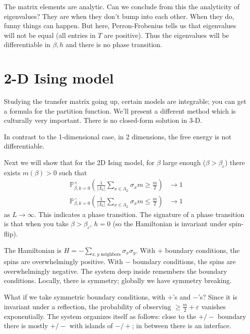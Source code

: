 \documentclass[12pt]{book}
\theoremstyle{norm}
\begin{document}
The matrix elements are analytic. Can we conclude from this the analyticity of eigenvalues? They are when they don't bump into each other. When they do, funny things can happen. But here, Perron-Frobenius tells us that eigenvalues will not be equal (all entries in $T$ are positive). Thus the eigenvalues will be differentiable in $\beta,h$ and there is no phase transition.

\section{2-D Ising model}

Studying the transfer matrix going up, certain models are integrable; you can get a formula for the partition function. We'll present a different method which is culturally very important.
There is no closed-form solution in 3-D.

In contrast to the 1-dimensional case, in 2 dimensions, the free energy is not differentiable. 

Next we will show that for the 2D Ising model, for $\beta$ large enough ($\beta>\beta_c$) there exists $m(\beta)>0$ such that 
\begin{align}
\mathbb{P}_{\beta,k=0}^+\left( {\frac{1}{|\Lambda_L|}\sum_{x\in \Lambda_L} \sigma_x m\ge\frac{m}{2}} \right)&\to 1\\
\mathbb{P}_{\beta,k=0}^-\left( {\frac{1}{|\Lambda_L|}\sum_{x\in \Lambda_L} \sigma_x m\le \frac{m}{2}} \right)&\to 1
\end{align}
as $L\to \infty$. This indicates a phase transition. 
The signature of a phase transition is that when you take $\beta>\beta_c$, $h=0$ (so the Hamiltonian is invariant under spin-flip).

The Hamiltonian is $H=-\sum_{x,y\text{ neighbors}} \sigma_x\sigma_y$.
With $+$ boundary conditions, the spins are overwhelmingly positive. With $-$ boundary conditions, the spins are overwhelmingly negative. The system deep inside remembers the boundary conditions. 
Locally, there is symmetry; globally we have symmetry breaking.

What if we take symmetric boundary conditions, with $+$'s and $-$'s? Since it is invariant under a reflection, the probability of observing $\ge \frac{m}{2}+\varepsilon$ vanishes exponentially. The system organizes itself as follows: close to the $+/-$ boundary there is mostly $+/-$ with islands of $-/+$; in between there is an interface.
\end{document}
